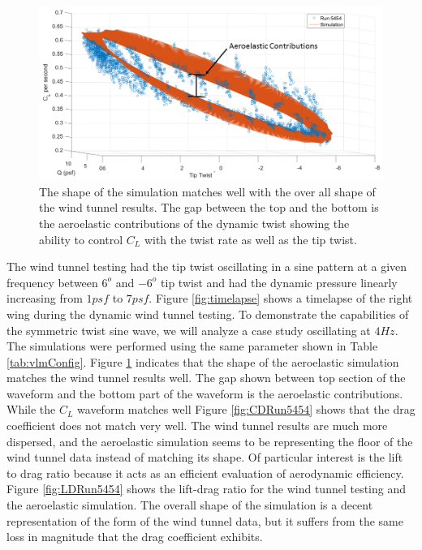 \documentclass[11pt]{ucthesis}
\begin{document}
\begin{figure}[thpb]
\centering
\includegraphics[width=.75\linewidth]{Figures/Run5454CLAeroelastic.png}
\caption{The shape of the simulation matches well with the over all shape of the wind tunnel results. The gap between the top and the bottom is the aeroelastic contributions of the dynamic twist showing the ability to control $C_L$ with the twist rate as well as the tip twist.}
\label{fig:CLRun5454}
\end{figure}

The wind tunnel testing had the tip twist oscillating in a sine pattern at a given frequency between $6^o$ and $-6^o$ tip twist and had the dynamic pressure linearly increasing from $1 psf$ to $7 psf$. Figure \ref{fig:timelapse} shows a timelapse of the right wing during the dynamic wind tunnel testing. To demonstrate the capabilities of the symmetric twist sine wave, we will analyze a case study oscillating at $4 Hz$. The simulations were performed using the same parameter shown in Table \ref{tab:vlmConfig}. Figure \ref{fig:CLRun5454} indicates that the shape of the aeroelastic simulation matches the wind tunnel results well. The gap shown between top section of the waveform and the bottom part of the waveform is the aeroelastic contributions. While the $C_L$ waveform matches well Figure \ref{fig:CDRun5454}  shows that the drag coefficient does not match very well. The wind tunnel results are much more dispersed, and the aeroelastic simulation seems to be representing the floor of the wind tunnel data instead of matching its shape. Of particular interest is the lift to drag ratio because it acts as an efficient evaluation of aerodynamic efficiency. Figure \ref{fig:LDRun5454} shows the lift-drag ratio for the wind tunnel testing and the aeroelastic simulation. The overall shape of the simulation is a decent representation of the form of the wind tunnel data, but it suffers from the same loss in magnitude that the drag coefficient exhibits.
\end{document}

